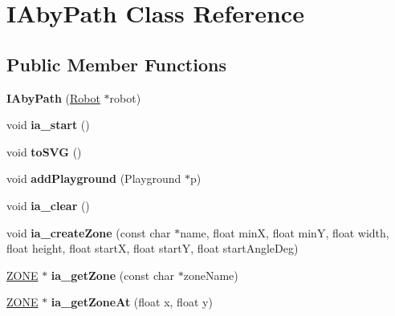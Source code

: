 \hypertarget{classIAbyPath}{}\section{I\+Aby\+Path Class Reference}
\label{classIAbyPath}
\subsection*{Public Member Functions}
\begin{DoxyCompactItemize}
\item 
\mbox{\label{classIAbyPath_a43a85a8e4d7019cee27899bd8131c3ea}} 
{\bfseries I\+Aby\+Path} (\hyperlink{classRobot}{Robot} $\ast$robot)
\item 
\mbox{\label{classIAbyPath_a0c7e960bbc87c86d716ac5aaa7da986a}} 
void {\bfseries ia\+\_\+start} ()
\item 
\mbox{\label{classIAbyPath_af470d678e57b5c6362fdcf70a856a489}} 
void {\bfseries to\+S\+VG} ()
\item 
\mbox{\label{classIAbyPath_ae82756d4338dfe7ac4811751dd9a5f17}} 
void {\bfseries add\+Playground} (Playground $\ast$p)
\item 
\mbox{\label{classIAbyPath_a5983b2fe214dbdf67119316fb15f9609}} 
void {\bfseries ia\+\_\+clear} ()
\item 
\mbox{\label{classIAbyPath_a7677d8a2c19d0c55b7a2dc3682d5b516}} 
void {\bfseries ia\+\_\+create\+Zone} (const char $\ast$name, float minX, float minY, float width, float height, float startX, float startY, float start\+Angle\+Deg)
\item 
\mbox{\label{classIAbyPath_a6a932bf580770a5087af7c9664c266e2}} 
\hyperlink{structZONE}{Z\+O\+NE} $\ast$ {\bfseries ia\+\_\+get\+Zone} (const char $\ast$zone\+Name)
\item 
\mbox{\label{classIAbyPath_a6cab060ab9536f67d1e7b222c82de780}} 
\hyperlink{structZONE}{Z\+O\+NE} $\ast$ {\bfseries ia\+\_\+get\+Zone\+At} (float x, float y)
\item 
\mbox{\label{classIAbyPath_a64a783a903ae312698ed266f4100ccff}} 

\end{DoxyCompactItemize}

